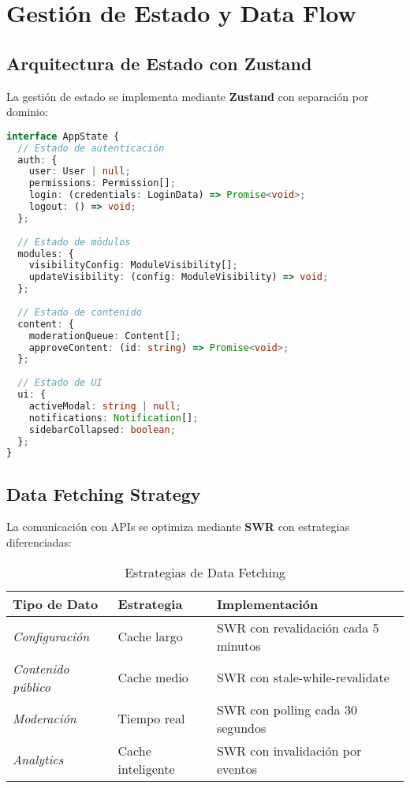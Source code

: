 \documentclass[12pt,a4paper]{article}
\begin{document}
\section{Gestión de Estado y Data Flow}

\subsection{Arquitectura de Estado con Zustand}

La gestión de estado se implementa mediante \textbf{Zustand} con separación por dominio:

\begin{lstlisting}[language=typescript, caption=Stores Especializados]
interface AppState {
  // Estado de autenticación
  auth: {
    user: User | null;
    permissions: Permission[];
    login: (credentials: LoginData) => Promise<void>;
    logout: () => void;
  };
  
  // Estado de módulos
  modules: {
    visibilityConfig: ModuleVisibility[];
    updateVisibility: (config: ModuleVisibility) => void;
  };
  
  // Estado de contenido
  content: {
    moderationQueue: Content[];
    approveContent: (id: string) => Promise<void>;
  };
  
  // Estado de UI
  ui: {
    activeModal: string | null;
    notifications: Notification[];
    sidebarCollapsed: boolean;
  };
}
\end{lstlisting}

\subsection{Data Fetching Strategy}

La comunicación con APIs se optimiza mediante \textbf{SWR} con estrategias diferenciadas:

\begin{table}[h!]
\centering
\begin{tabularx}{\textwidth}{|l|l|X|}
\hline
\textbf{Tipo de Dato} & \textbf{Estrategia} & \textbf{Implementación} \\
\hline
\textit{Configuración} & Cache largo & SWR con revalidación cada 5 minutos \\
\hline
\textit{Contenido público} & Cache medio & SWR con stale-while-revalidate \\
\hline
\textit{Moderación} & Tiempo real & SWR con polling cada 30 segundos \\
\hline
\textit{Analytics} & Cache inteligente & SWR con invalidación por eventos \\
\hline
\end{tabularx}
\caption{Estrategias de Data Fetching}
\end{table}
\end{document}
